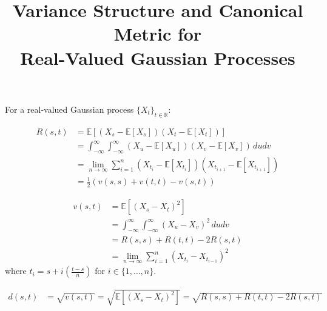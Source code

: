 \documentclass{article}
\begin{document}
\title{Variance Structure and Canonical Metric for\\Real-Valued Gaussian Processes}
\author{}
\date{}
\maketitle

\noindent For a real-valued Gaussian process $\{X_t\}_{t \in \mathbb{R}}$:

\begin{align*}
R(s,t) &= \mathbb{E}[(X_s - \mathbb{E}[X_s])(X_t - \mathbb{E}[X_t])] \\
&= \int_{-\infty}^{\infty}\int_{-\infty}^{\infty} (X_u - \mathbb{E}[X_u])(X_v - \mathbb{E}[X_v]) \, dudv \\
&= \lim_{n \to \infty} \sum_{i=1}^n (X_{t_i} - \mathbb{E}[X_{t_i}])(X_{t_{i+1}} - \mathbb{E}[X_{t_{i+1}}]) \\
&= \frac{1}{2}(v(s,s) + v(t,t) - v(s,t))
\end{align*}

\begin{align*}
v(s,t) &= \mathbb{E}[(X_s - X_t)^2] \\
&= \int_{-\infty}^{\infty}\int_{-\infty}^{\infty} (X_u - X_v)^2 \, dudv \\
&= R(s,s) + R(t,t) - 2R(s,t) \\
&= \lim_{n \to \infty} \sum_{i=1}^n (X_{t_i} - X_{t_{i-1}})^2
\end{align*}
where $t_i = s + i(\frac{t-s}{n})$ for $i \in \{1,\ldots,n\}$.

\begin{align*}
d(s,t) &= \sqrt{v(s,t)} = \sqrt{\mathbb{E}[(X_s - X_t)^2]} = \sqrt{R(s,s) + R(t,t) - 2R(s,t)}
\end{align*}
\end{document}
